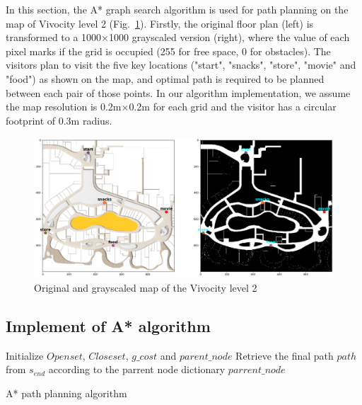 \documentclass[hyperref]{article}
\theoremstyle{nonumberplain}
\begin{document}
In this section, the A* graph search algorithm is used for path planning on the map of Vivocity level 2 (Fig.~\ref{fig1}). Firstly, the original floor plan (left) is transformed to a 1000$\times$1000 grayscaled version (right), where the value of each pixel marks if the grid is occupied (255 for free space, 0 for obstacles). The visitors plan to visit the five key locations ("start", "snacks", "store", "movie" and "food") as shown on the map, and optimal path is required to be planned between each pair of those points. In our algorithm implementation, we assume the map resolution is 0.2m$\times$0.2m for each grid and the visitor has a circular footprint of 0.3m radius. 


\begin{figure}[H]
	\centering
		\includegraphics[width=12cm]{map.png}
	\caption{Original and grayscaled map of the Vivocity level 2}
	\label{fig1}
\end{figure} 

\subsection{Implement of A* algorithm}
\hspace{1.0em}

\begin{algorithm}[H]\footnotesize
	\SetAlgoLined
	
	Initialize $Openset$, $Closeset$, $g\_cost$ and $parent\_node$\;
	Retrieve the final path $path$ from $s_{end}$ according to the parrent node dictionary $parrent\_node$\;
	\caption{A* path planning algorithm}
	\label{alg:algorithm1} 
\end{algorithm}
\end{document}
